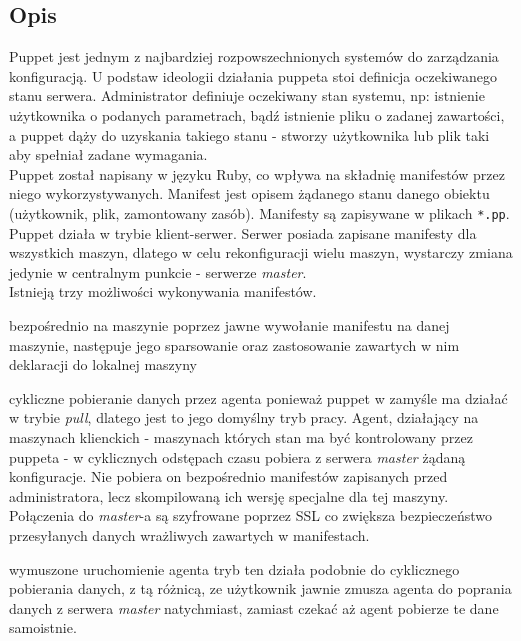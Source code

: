 \subsection{Opis}
\label{sec:puppet_opis}
Puppet\cite{puppet} jest jednym z najbardziej rozpowszechnionych systemów do zarządzania konfiguracją.
U podstaw ideologii działania puppeta stoi definicja oczekiwanego stanu serwera.
Administrator definiuje oczekiwany stan systemu, np: istnienie użytkownika o podanych parametrach, bądź istnienie pliku o zadanej zawartości, a puppet dąży do uzyskania takiego stanu - stworzy użytkownika lub plik taki aby spełniał zadane wymagania.\\
Puppet został napisany w języku Ruby, co wpływa na składnię manifestów przez niego wykorzystywanych.
Manifest jest opisem żądanego stanu danego obiektu (użytkownik, plik, zamontowany zasób).
Manifesty są zapisywane w plikach \texttt{*.pp}.\\
Puppet działa w trybie klient-serwer.
Serwer posiada zapisane manifesty dla wszystkich maszyn, dlatego w celu rekonfiguracji wielu maszyn, wystarczy zmiana jedynie w centralnym punkcie - serwerze \textit{master}.\\
Istnieją trzy możliwości wykonywania manifestów.
\begin{description}
	\item{bezpośrednio na maszynie}
		poprzez jawne wywołanie manifestu na danej maszynie, następuje jego sparsowanie oraz zastosowanie zawartych w nim deklaracji do lokalnej maszyny
	\item{cykliczne pobieranie danych przez agenta}
		ponieważ puppet w zamyśle ma działać w trybie \textit{pull}, dlatego jest to jego domyślny tryb pracy.
		Agent, działający na maszynach klienckich - maszynach których stan ma być kontrolowany przez puppeta - w cyklicznych odstępach czasu pobiera z serwera \textit{master} żądaną konfiguracje.
		Nie pobiera on bezpośrednio manifestów zapisanych przed administratora, lecz skompilowaną ich wersję specjalne dla tej maszyny.\\
		Połączenia do \textit{master}-a są szyfrowane poprzez SSL co zwiększa bezpieczeństwo przesyłanych danych wrażliwych zawartych w manifestach.
	\item{wymuszone uruchomienie agenta}
		tryb ten działa podobnie do cyklicznego pobierania danych, z tą różnicą, ze użytkownik jawnie zmusza agenta do poprania danych z serwera \textit{master} natychmiast, zamiast czekać aż agent pobierze te dane samoistnie.
\end{description}
